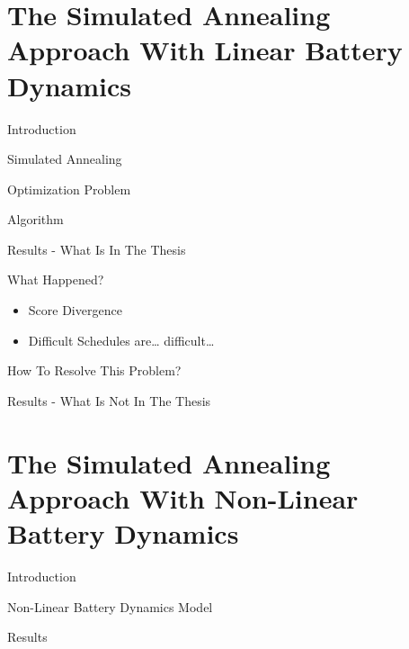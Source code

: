 \documentclass[bigger]{beamer}
\begin{document}
\section{The Simulated Annealing Approach With Linear Battery Dynamics}
\label{sec:orgea2ee48}
\begin{frame}[label={sec:orgd0dfe8f}]{Introduction}
\end{frame}
\begin{frame}[label={sec:orgab42f36}]{Simulated Annealing}
\end{frame}
\begin{frame}[label={sec:orge854b6f}]{Optimization Problem}
\end{frame}
\begin{frame}[label={sec:orgbd6d356}]{Algorithm}
\end{frame}
\begin{frame}[label={sec:org3408069}]{Results - What Is In The Thesis}
\end{frame}
\begin{frame}[label={sec:org0270a51}]{What Happened?}
\begin{itemize}
\item Score Divergence
\item Difficult Schedules are\ldots{} difficult\ldots{}
\end{itemize}
\end{frame}
\begin{frame}[label={sec:org17ac5a2}]{How To Resolve This Problem?}
\end{frame}
\begin{frame}[label={sec:org206ad5c}]{Results - What Is Not In The Thesis}
\end{frame}
\section{The Simulated Annealing Approach With Non-Linear Battery Dynamics}
\label{sec:org6e039b3}
\begin{frame}[label={sec:org4397e0b}]{Introduction}
\end{frame}
\begin{frame}[label={sec:org6f71426}]{Non-Linear Battery Dynamics Model}
\end{frame}
\begin{frame}[label={sec:org1586dd2}]{Results}
\end{frame}
\end{document}
